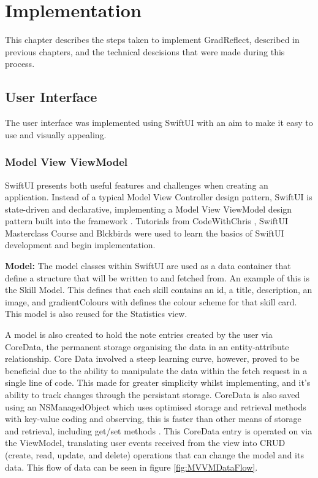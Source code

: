 \documentclass{l4proj}
\begin{document}
\chapter{Implementation} \label{implementation}

This chapter describes the steps taken to implement GradReflect, described in previous chapters, and the technical descisions that were made during this process.

\section{User Interface}

The user interface was implemented using SwiftUI with an aim to make it easy to use and visually appealing. 

\subsection{Model View ViewModel}

SwiftUI presents both useful features and challenges when creating an application. Instead of a typical Model View Controller design pattern, SwiftUI
is state-driven and declarative, implementing a Model View ViewModel design pattern built into the framework \citep{naumov_swiftui_architecture_2019}.
Tutorials from CodeWithChris \citep{ching_codewithchris_2021}, SwiftUI Masterclass Course \citep{petras_swiftui_2021} and Blckbirds \citep{blckbirds_learn_2021} 
were used to learn the basics of SwiftUI development and begin implementation.

\textbf{Model:} The model classes within SwiftUI are used as a data container that define a structure that will be written to and fetched from. An example of 
this is the Skill Model. This defines that each skill contains an id, a title, description, an image, and gradientColours with defines the colour scheme for 
that skill card. This model is also reused for the Statistics view.

A model is also created to hold the note entries created by the user via CoreData, the permanent storage 
organising the data in an entity-attribute relationship. Core Data involved a steep learning curve, however, proved to be 
beneficial due to the ability to manipulate the data within the fetch request in a single line of code. This made for greater simplicity
whilst implementing, and it's ability to track changes through the persistant storage. CoreData is also saved using an NSManagedObject which uses optimised
storage and retrieval methods with key-value coding and observing, this is faster than other means of storage and retrieval, including get/set methods 
\citep{apple_developer_documentation_core_2021}. 
This CoreData entry is operated on via the ViewModel, translating user events received from the view into CRUD (create, read, update, and delete) operations that 
can change the model and its data. This flow of data can be seen in figure \ref{fig:MVVMDataFlow}. 
\end{document}
